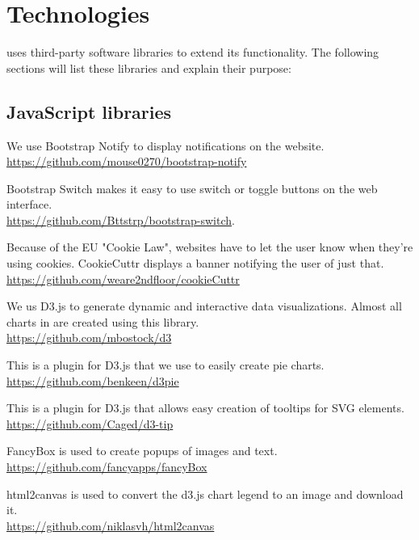 \section{Technologies}
\label{sec:technologies}
{\germinate} uses third-party software libraries to extend its functionality. The following sections will list these libraries and explain their purpose:

\subsection{JavaScript libraries}

\begin{description}[align=left,style=nextline,leftmargin=*,labelsep=\parindent,font=\bfseries]
	\item[Bootstrap Notify] We use Bootstrap Notify to display notifications on the website.\\\url{https://github.com/mouse0270/bootstrap-notify}
	\item[Bootstrap Switch] Bootstrap Switch makes it easy to use switch or toggle buttons on the web interface.\\\url{https://github.com/Bttstrp/bootstrap-switch}.
	\item[CookieCuttr] Because of the EU "Cookie Law", websites have to let the user know when they're using cookies. CookieCuttr displays a banner notifying the user of just that.\\\url{https://github.com/weare2ndfloor/cookieCuttr}
	\item[D3.js] We us D3.js to generate dynamic and interactive data visualizations. Almost all charts in {\germinate} are created using this library.\\\url{https://github.com/mbostock/d3}
	\item[d3Pie] This is a plugin for D3.js that we use to easily create pie charts.\\\url{https://github.com/benkeen/d3pie}
	\item[D3.tip] This is a plugin for D3.js that allows easy creation of tooltips for SVG elements.\\\url{https://github.com/Caged/d3-tip}
	\item[FancyBox] FancyBox is used to create popups of images and text. \\\url{https://github.com/fancyapps/fancyBox}
	\item[html2canvas] html2canvas is used to convert the d3.js chart legend to an image and download it.
	\\\url{https://github.com/niklasvh/html2canvas}

\end{description}
